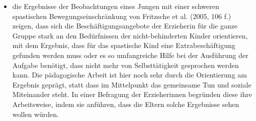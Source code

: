 \begin{itemize}
\item die Ergebnisse der Beobachtungen eines Jungen mit einer schweren spastischen Bewegungseinschränkung von Fritzsche et al. (2005, 106 f.)  zeigen, dass sich die Beschäftigungsangebote der Erzieherin für die ganze Gruppe stark an den Bedürfnissen der nicht-behinderten Kinder orientieren, mit dem Ergebnis, dass für das spastische Kind eine Extrabeschäftigung gefunden werden muss oder es so umfangreiche Hilfe bei der Ausführung der Aufgabe benötigt, dass nicht mehr von Selbsttätigkeit gesprochen werden kann. Die pädagogische Arbeit ist hier noch sehr durch die Orientierung am Ergebnis geprägt, statt dass im Mittelpunkt das gemeinsame Tun und soziale Miteinander steht. In einer Befragung der Erzieherinnen begründen diese ihre Arbeitsweise, indem sie anführen, dass die Eltern solche Ergebnisse sehen wollen würden.

\end{itemize}